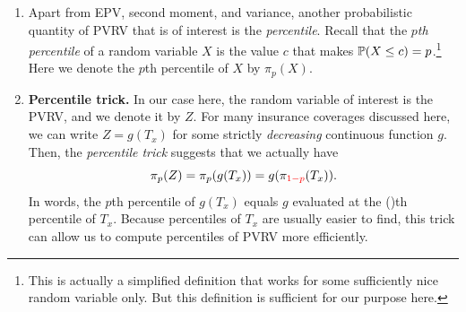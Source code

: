 \begin{enumerate}
\begin{itemize}
\item \emph{Endowment insurance:}
\begin{itemize}
\item \emph{(discrete)} \(\Ax{\endowxn}\overset{(m\le n)}{=}\Ax{\itop{x}:\angl{m}}
+\Ex[m]{x}\Ax{x+m:\angl{n-m}}\overset{(m=1)}{=}v\qx[]{x}+v\px[]{x}\Ax{x+1:\angl{n-1}}\). \begin{warning}
On the RHS of the second expression, be careful about which ``\(A\)'' has a
``\(1\)'' on top of \(x\), and which does not!
\end{warning}
\item \emph{(continuous)} \(\Ax*{\endowxn}\overset{(m\le n)}{=}\Ax*{\itop{x}:\angl{m}}+\Ex[m]{x}\Ax*{x+m:\angl{n-m}}\).
\end{itemize}
\begin{center}
\end{center}
\end{itemize}
\item Apart from EPV, second moment, and variance,
another probabilistic quantity of PVRV that is of interest is the
\emph{percentile}. Recall that the \emph{\(p\)th percentile} of a random variable
\(X\) is the value \(c\) that makes \(\mathbb{P}\qty(X\le c)=p\).\footnote{This is
actually a simplified definition that works for some sufficiently nice random
variable only. But this definition is sufficient for our purpose here.} Here we
denote the \(p\)th percentile of \(X\) by \(\pi_{p}(X)\).

\item \label{it:percentile-trick-insurance} \textbf{Percentile trick.} In our case here,
the random variable of interest is the PVRV, and we denote it by \(Z\). For
many insurance coverages discussed here, we can write \(Z=g(T_x)\) for some
strictly \emph{decreasing} continuous function \(g\). Then, the \emph{percentile trick}
suggests that we actually have
\[
\pi_{p}(Z)=\pi_{p}(g(T_x))=g(\pi_{{\color{red}1-p}}(T_x)).
\]
In words, the \(p\)th percentile of \(g(T_x)\) equals \(g\) evaluated at the
()th percentile of \(T_x\). Because percentiles of \(T_x\) are
usually easier to find, this trick can allow us to compute percentiles of PVRV
more efficiently.
\end{enumerate}
